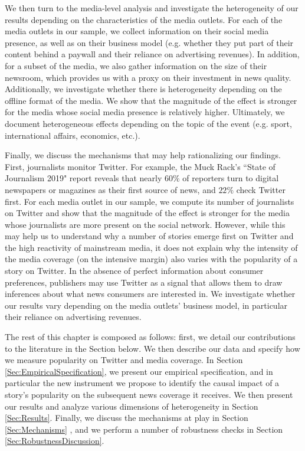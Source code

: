 We then turn to the media-level analysis and investigate the heterogeneity of our results depending on the characteristics of the media outlets. For each of the media outlets in our sample, we collect information on their social media presence, as well as on their business model (e.g. whether they put part of their content behind a paywall and their reliance on advertising revenues). In addition, for a subset of the media, we also gather information on the size of their newsroom, which provides us with a proxy on their investment in news quality. Additionally, we investigate whether there is heterogeneity depending on the offline format of the media. We show that the magnitude of the effect is stronger for the media whose social media presence is relatively higher. Ultimately, we document heterogeneous effects  depending on the topic of the event (e.g. sport, international affairs, economics, etc.).

Finally, we discuss the mechanisms that may help rationalizing our findings. First, journalists monitor Twitter. For example, the Muck Rack’s  ``State of Journalism 2019" report reveals that nearly $60\%$ of reporters turn to digital newspapers or magazines as their first source of news, and $22\%$ check Twitter first. For each media outlet in our sample, we compute its number of journalists on Twitter and show that the magnitude of the effect is stronger for the media whose journalists are more present on the social network. However, while this may help us to understand why a number of stories emerge first on Twitter and the high reactivity of mainstream media, it does not explain why the intensity of the media coverage (on the intensive margin) also varies with the popularity of a story on Twitter. In the absence of perfect information about consumer preferences, publishers may use Twitter as a signal that allows them to draw inferences about what news consumers are interested in. We investigate whether our results vary depending on the media outlets' business model, in particular their reliance on advertising revenues.

\medskip
The rest of this chapter is composed as follows: first, we detail our contributions to the literature in the Section below.  We then describe our data and specify how we measure popularity on Twitter and media coverage. In Section \ref{Sec:EmpiricalSpecification}, we present our empirical specification, and in particular the new instrument we propose to identify the causal impact of a story's popularity on the subsequent news coverage it receives. We then present our results and analyze various dimensions of heterogeneity in Section \ref{Sec:Results}. Finally, we discuss the mechanisms at play in Section \ref{Sec:Mechanisms} , and we perform a number of robustness checks in Section \ref{Sec:RobustnessDiscussion}.

